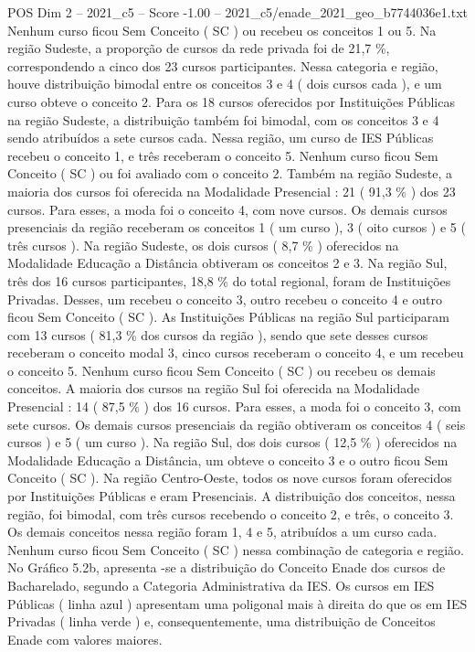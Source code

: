 \begin{textsample}{POS Dim 2 – 2021\_c5 – Score -1.00 – 2021\_c5/enade\_2021\_geo\_b7744036e1.txt}
Nenhum curso ficou Sem Conceito ( SC ) ou recebeu os conceitos 1 ou 5.
Na região Sudeste, a proporção de cursos da rede privada foi de 21,7 \%, correspondendo a cinco dos 23 cursos participantes.
Nessa categoria e região, houve distribuição bimodal entre os conceitos 3 e 4 ( dois cursos cada ), e um curso obteve o conceito 2.
Para os 18 cursos oferecidos por Instituições Públicas na região Sudeste, a distribuição também foi bimodal, com os conceitos 3 e 4 sendo atribuídos a sete cursos cada.
Nessa região, um curso de IES Públicas recebeu o conceito 1, e três receberam o conceito 5.
Nenhum curso ficou Sem Conceito ( SC ) ou foi avaliado com o conceito 2.
Também na região Sudeste, a maioria dos cursos foi oferecida na Modalidade Presencial : 21 ( 91,3 \% ) dos 23 cursos.
Para esses, a moda foi o conceito 4, com nove cursos.
Os demais cursos presenciais da região receberam os conceitos 1 ( um curso ), 3 ( oito cursos ) e 5 ( três cursos ).
Na região Sudeste, os dois cursos ( 8,7 \% ) oferecidos na Modalidade Educação a Distância obtiveram os conceitos 2 e 3.
Na região Sul, três dos 16 cursos participantes, 18,8 \% do total regional, foram de Instituições Privadas.
Desses, um recebeu o conceito 3, outro recebeu o conceito 4 e outro ficou Sem Conceito ( SC ).
As Instituições Públicas na região Sul participaram com 13 cursos ( 81,3 \% dos cursos da região ), sendo que sete desses cursos receberam o conceito modal 3, cinco cursos receberam o conceito 4, e um recebeu o conceito 5.
Nenhum curso ficou Sem Conceito ( SC ) ou recebeu os demais conceitos.
A maioria dos cursos na região Sul foi oferecida na Modalidade Presencial : 14 ( 87,5 \% ) dos 16 cursos.
Para esses, a moda foi o conceito 3, com sete cursos.
Os demais cursos presenciais da região obtiveram os conceitos 4 ( seis cursos ) e 5 ( um curso ).
Na região Sul, dos dois cursos ( 12,5 \% ) oferecidos na Modalidade Educação a Distância, um obteve o conceito 3 e o outro ficou Sem Conceito ( SC ).
Na região Centro-Oeste, todos os nove cursos foram oferecidos por Instituições Públicas e eram Presenciais.
A distribuição dos conceitos, nessa região, foi bimodal, com três cursos recebendo o conceito 2, e três, o conceito 3.
Os demais conceitos nessa região foram 1, 4 e 5, atribuídos a um curso cada.
Nenhum curso ficou Sem Conceito ( SC ) nessa combinação de categoria e região.
No Gráfico 5.2b, apresenta -se a distribuição do Conceito Enade dos cursos de Bacharelado, segundo a Categoria Administrativa da IES.
Os cursos em IES Públicas ( linha azul ) apresentam uma poligonal mais à direita do que os em IES Privadas ( linha verde ) e, consequentemente, uma distribuição de Conceitos Enade com valores maiores.

\end{textsample}
